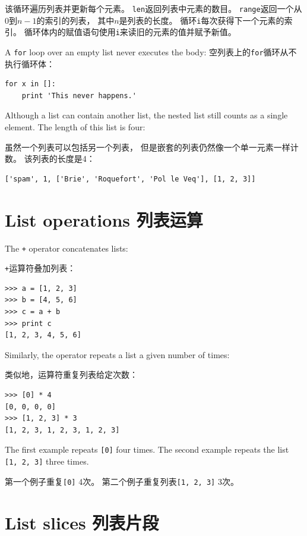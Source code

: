 \documentclass[10pt]{book}
\begin{document}
\begin{CJK}{UTF8}{gbsn}
该循环遍历列表并更新每个元素。
{\tt len}返回列表中元素的数目。
{\tt range}返回一个从0到$n-1$的索引的列表，
其中$n$是列表的长度。
循环{\tt i}每次获得下一个元素的索引。
循环体内的赋值语句使用{\tt i}来读旧的元素的值并赋予新值。

A {\tt for} loop over an empty list never executes the body:
空列表上的{\tt for}循环从不执行循环体：

\begin{verbatim}
for x in []:
    print 'This never happens.'
\end{verbatim}
%
Although a list can contain another list, the nested
list still counts as a single element.  The length of this list is
four:

虽然一个列表可以包括另一个列表，
但是嵌套的列表仍然像一个单一元素一样计数。
该列表的长度是4：

\begin{verbatim}
['spam', 1, ['Brie', 'Roquefort', 'Pol le Veq'], [1, 2, 3]]
\end{verbatim}



\section{List operations 列表运算}

The {\tt +} operator concatenates lists:

{\tt +}运算符叠加列表：

\begin{verbatim}
>>> a = [1, 2, 3]
>>> b = [4, 5, 6]
>>> c = a + b
>>> print c
[1, 2, 3, 4, 5, 6]
\end{verbatim}
%
Similarly, the {\tt *} operator repeats a list a given number of times:

类似地，{\tt *}运算符重复列表给定次数：

\begin{verbatim}
>>> [0] * 4
[0, 0, 0, 0]
>>> [1, 2, 3] * 3
[1, 2, 3, 1, 2, 3, 1, 2, 3]
\end{verbatim}
%
The first example repeats {\tt [0]} four times.  The second example
repeats the list {\tt [1, 2, 3]} three times.

第一个例子重复{\tt [0]} 4次。
第二个例子重复列表{\tt [1, 2, 3]} 3次。


\section{List slices 列表片段}


\end{CJK}
\end{document}
